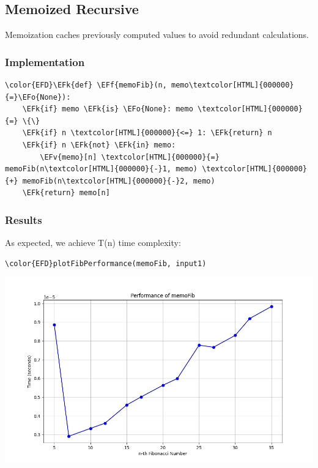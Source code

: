 \documentclass[a4paper,12pt]{article}
\newcommand{\EFk}[1]{\textcolor{EFk}{#1}} %
\newcommand{\EFf}[1]{\textcolor{EFf}{#1}} %
\newcommand{\EFv}[1]{\textcolor{EFv}{#1}} %
\newcommand{\EFo}[1]{\textcolor{EFo}{#1}} %
\begin{document}
\subsection{Memoized Recursive}
\label{sec:org9b637ed}
Memoization caches previously computed values to avoid redundant calculations.
\subsubsection{Implementation}
\label{sec:orgc5be178}
\begin{Code}
\begin{Verbatim}
\color{EFD}\EFk{def} \EFf{memoFib}(n, memo\textcolor[HTML]{000000}{=}\EFo{None}):
    \EFk{if} memo \EFk{is} \EFo{None}: memo \textcolor[HTML]{000000}{=} \{\}
    \EFk{if} n \textcolor[HTML]{000000}{<=} 1: \EFk{return} n
    \EFk{if} n \EFk{not} \EFk{in} memo:
        \EFv{memo}[n] \textcolor[HTML]{000000}{=} memoFib(n\textcolor[HTML]{000000}{-}1, memo) \textcolor[HTML]{000000}{+} memoFib(n\textcolor[HTML]{000000}{-}2, memo)
    \EFk{return} memo[n]
\end{Verbatim}
\end{Code}
\subsubsection{Results}
\label{sec:orga110bf4}
As expected, we achieve T(n) time complexity:
\begin{Code}
\begin{Verbatim}
\color{EFD}plotFibPerformance(memoFib, input1)
\end{Verbatim}
\end{Code}

\begin{center}
\includegraphics[width=.9\linewidth]{memoFib.png}
\label{org6bf26ab}
\end{center}
\end{document}

